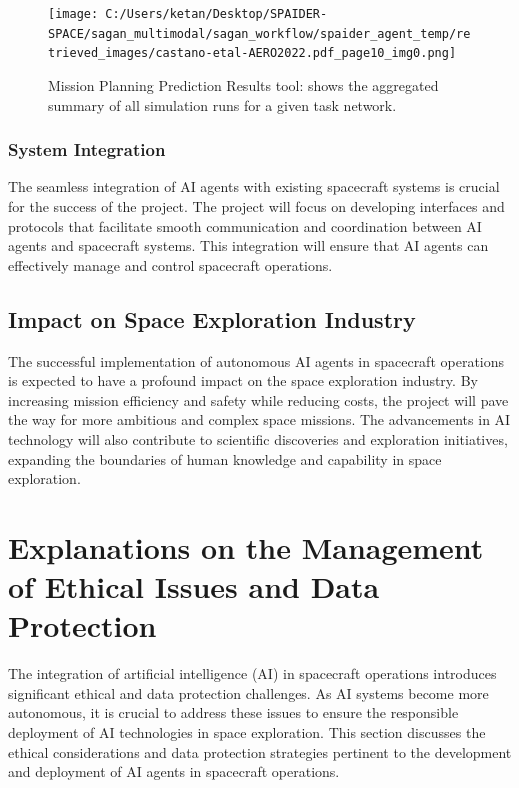 \documentclass[a4paper, 11pt]{article}
\begin{document}
\begin{figure}[htbp]
    \centering
    \texttt{[image: C:/Users/ketan/Desktop/SPAIDER-SPACE/sagan\_multimodal/sagan\_workflow/spaider\_agent\_temp/retrieved\_images/castano-etal-AERO2022.pdf\_page10\_img0.png]}
    \caption{Mission Planning Prediction Results tool: shows the aggregated summary of all simulation runs for a given task network.}
    \label{fig:mission-planning-prediction}
\end{figure}

\subsubsection{System Integration}

The seamless integration of AI agents with existing spacecraft systems is crucial for the success of the project. The project will focus on developing interfaces and protocols that facilitate smooth communication and coordination between AI agents and spacecraft systems. This integration will ensure that AI agents can effectively manage and control spacecraft operations.

\subsection{Impact on Space Exploration Industry}

The successful implementation of autonomous AI agents in spacecraft operations is expected to have a profound impact on the space exploration industry. By increasing mission efficiency and safety while reducing costs, the project will pave the way for more ambitious and complex space missions. The advancements in AI technology will also contribute to scientific discoveries and exploration initiatives, expanding the boundaries of human knowledge and capability in space exploration.
\section{Explanations on the Management of Ethical Issues and Data Protection}

The integration of artificial intelligence (AI) in spacecraft operations introduces significant ethical and data protection challenges. As AI systems become more autonomous, it is crucial to address these issues to ensure the responsible deployment of AI technologies in space exploration. This section discusses the ethical considerations and data protection strategies pertinent to the development and deployment of AI agents in spacecraft operations.
\end{document}
